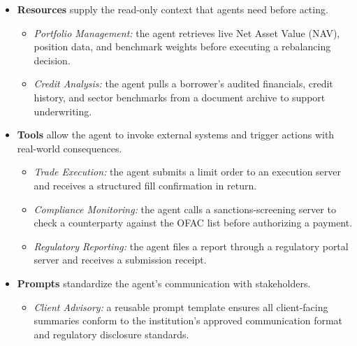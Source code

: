 \documentclass{article}
\begin{document}
\begin{itemize}
  \item \textbf{Resources} supply the read-only context that agents need before acting.
  \begin{itemize}
    \item \textit{Portfolio Management:} the agent retrieves live  Net Asset Value (NAV), position data, and benchmark weights before executing a rebalancing decision.
    \item \textit{Credit Analysis:} the agent pulls a borrower's audited financials, credit history, and sector benchmarks from a document archive to support underwriting.
  \end{itemize}

  \item \textbf{Tools} allow the agent to invoke external systems and trigger actions with real-world consequences.
  \begin{itemize}
    \item \textit{Trade Execution:} the agent submits a limit order to an execution server and receives a structured fill confirmation in return.
    \item \textit{Compliance Monitoring:} the agent calls a sanctions-screening server to check a counterparty against the OFAC list before authorizing a payment.
    \item \textit{Regulatory Reporting:} the agent files a report through a regulatory portal server and receives a submission receipt.
  \end{itemize}

  \item \textbf{Prompts} standardize the agent's communication with stakeholders.
  \begin{itemize}
    \item \textit{Client Advisory:} a reusable prompt template ensures all client-facing summaries conform to the institution's approved communication format and regulatory disclosure standards.
  \end{itemize}
\end{itemize}


\end{document}
